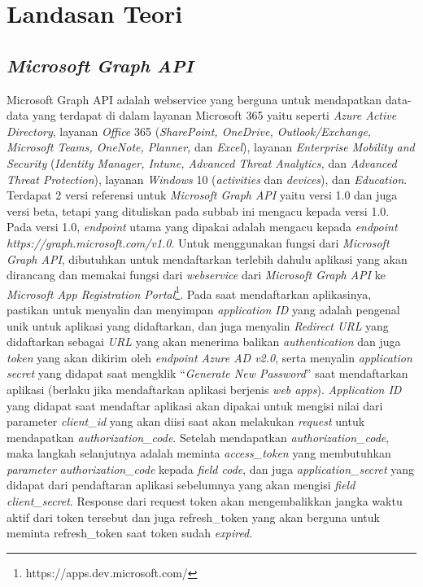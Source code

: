 \chapter{Landasan Teori}
\label{chap:teori}

\section{\textit{Microsoft Graph API}}
\label{sec:microsoftgraph}
Microsoft Graph API adalah webservice yang berguna untuk mendapatkan data-data yang terdapat di dalam layanan Microsoft 365 yaitu seperti \textit{Azure Active Directory}, layanan \textit{Office} 365 (\textit{SharePoint, OneDrive, Outlook/Exchange, Microsoft Teams, OneNote, Planner,} dan \textit{Excel}), layanan \textit{Enterprise Mobility and Security} (\textit{Identity Manager, Intune, Advanced Threat Analytics,} dan \textit{Advanced Threat Protection}), layanan \textit{Windows} 10 (\textit{activities} dan \textit{devices}), dan \textit{Education}. Terdapat 2 versi referensi untuk \textit{Microsoft Graph API} yaitu versi 1.0 dan juga versi beta, tetapi yang dituliskan pada subbab ini mengacu kepada versi 1.0. Pada versi 1.0, \textit{endpoint} utama yang dipakai adalah mengacu kepada \textit{endpoint} \textit{https://graph.microsoft.com/v1.0}. Untuk menggunakan fungsi dari \textit{Microsoft Graph API}, dibutuhkan untuk mendaftarkan terlebih dahulu aplikasi yang akan dirancang dan memakai fungsi dari \textit{webservice} dari \textit{Microsoft Graph API} ke \textit{Microsoft App Registration Portal}\footnote{https://apps.dev.microsoft.com/}. Pada saat mendaftarkan aplikasinya, pastikan untuk menyalin dan menyimpan \textit{application ID} yang adalah pengenal unik untuk aplikasi yang didaftarkan, dan juga menyalin \textit{Redirect URL} yang didaftarkan sebagai \textit{URL} yang akan menerima balikan \textit{authentication} dan juga \textit{token} yang akan dikirim oleh \textit{endpoint Azure AD v2.0}, serta menyalin \textit{application secret} yang didapat saat mengklik ``\textit{Generate New Password}'' saat mendaftarkan aplikasi (berlaku jika mendaftarkan aplikasi berjenis \textit{web apps}). \textit{Application ID} yang didapat saat mendaftar aplikasi akan dipakai untuk mengisi nilai dari parameter \textit{client\_id} yang akan diisi saat akan melakukan \textit{request} untuk mendapatkan \textit{authorization\_code}. Setelah mendapatkan \textit{authorization\_code}, maka langkah selanjutnya adalah meminta \textit{access\_token} yang membutuhkan \textit{parameter} \textit{authorization\_code} kepada \textit{field code}, dan juga \textit{application\_secret} yang didapat dari pendaftaran aplikasi sebelumnya yang akan mengisi \textit{field client\_secret}. Response dari request token akan mengembalikkan jangka waktu aktif dari token tersebut dan juga refresh\_token yang akan berguna untuk meminta refresh\_token saat token sudah \textit{expired}.

